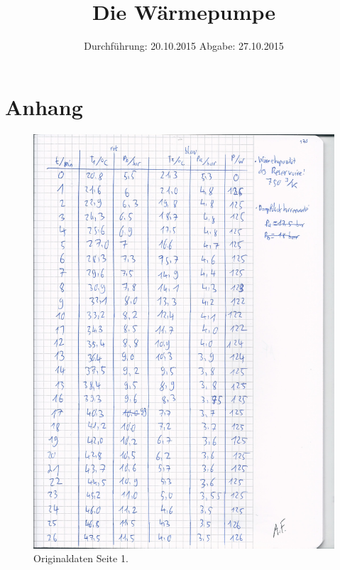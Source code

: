 

\subject{Versuchsprotokoll zum Versuch Nr. 206}
\title{Die Wärmepumpe}
\date{
  Durchführung: 20.10.2015
  \hspace{3em}
  Abgabe: 27.10.2015
}



\maketitle
\thispagestyle{empty}
\tableofcontents
\newpage






\section{Anhang}
\begin{figure}[H]
  \centering
  \includegraphics[width=\textwidth]{original_v206_1.jpg}
  \caption{Originaldaten Seite 1.}
  \label{fig:o1}
\end{figure}

